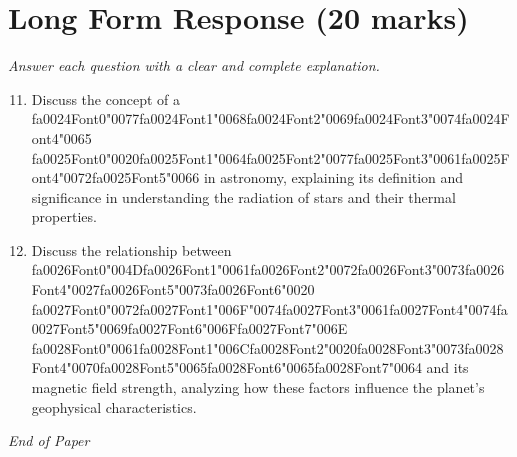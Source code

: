 \documentclass[12pt]{article}
\begin{document}
\section*{Long Form Response (20 marks)}
\textit{Answer each question with a clear and complete explanation.}
\begin{enumerate}[label=\arabic*.]
\setcounter{enumi}{10}
\item Discuss the concept of a {\csname fa0024Font0\endcsname\char"0077}{\csname fa0024Font1\endcsname\char"0068}{\csname fa0024Font2\endcsname\char"0069}{\csname fa0024Font3\endcsname\char"0074}{\csname fa0024Font4\endcsname\char"0065} {\csname fa0025Font0\endcsname\char"0020}{\csname fa0025Font1\endcsname\char"0064}{\csname fa0025Font2\endcsname\char"0077}{\csname fa0025Font3\endcsname\char"0061}{\csname fa0025Font4\endcsname\char"0072}{\csname fa0025Font5\endcsname\char"0066} in astronomy, explaining its definition and
significance in understanding the radiation of stars and their thermal properties.
\item Discuss the relationship between {\csname fa0026Font0\endcsname\char"004D}{\csname fa0026Font1\endcsname\char"0061}{\csname fa0026Font2\endcsname\char"0072}{\csname fa0026Font3\endcsname\char"0073}{\csname fa0026Font4\endcsname\char"0027}{\csname fa0026Font5\endcsname\char"0073}{\csname fa0026Font6\endcsname\char"0020} {\csname fa0027Font0\endcsname\char"0072}{\csname fa0027Font1\endcsname\char"006F}{\char"0074}{\csname fa0027Font3\endcsname\char"0061}{\csname fa0027Font4\endcsname\char"0074}{\csname fa0027Font5\endcsname\char"0069}{\csname fa0027Font6\endcsname\char"006F}{\csname fa0027Font7\endcsname\char"006E} {\csname fa0028Font0\endcsname\char"0061}{\csname fa0028Font1\endcsname\char"006C}{\csname fa0028Font2\endcsname\char"0020}{\csname fa0028Font3\endcsname\char"0073}{\csname fa0028Font4\endcsname\char"0070}{\csname fa0028Font5\endcsname\char"0065}{\csname fa0028Font6\endcsname\char"0065}{\csname fa0028Font7\endcsname\char"0064} and its magnetic field strength,
analyzing how these factors influence the planet's geophysical characteristics.
\end{enumerate}

\vfill
\noindent\textit{End of Paper}
\end{document}

